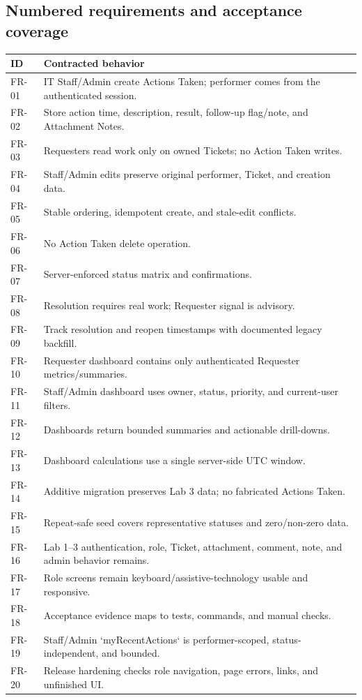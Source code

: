 \documentclass[10pt,a4paper]{article}
\begin{document}
\subsection*{Numbered requirements and acceptance coverage}
\begin{center}\scriptsize
\begin{tabularx}{\linewidth}{@{}p{17mm}Y@{}}
\toprule
ID & Contracted behavior \\
\midrule
FR-01 & IT Staff/Admin create Actions Taken; performer comes from the authenticated session. \\
FR-02 & Store action time, description, result, follow-up flag/note, and Attachment Notes. \\
FR-03 & Requesters read work only on owned Tickets; no Action Taken writes. \\
FR-04 & Staff/Admin edits preserve original performer, Ticket, and creation data. \\
FR-05 & Stable ordering, idempotent create, and stale-edit conflicts. \\
FR-06 & No Action Taken delete operation. \\
FR-07 & Server-enforced status matrix and confirmations. \\
FR-08 & Resolution requires real work; Requester signal is advisory. \\
FR-09 & Track resolution and reopen timestamps with documented legacy backfill. \\
FR-10 & Requester dashboard contains only authenticated Requester metrics/summaries. \\
FR-11 & Staff/Admin dashboard uses owner, status, priority, and current-user filters. \\
FR-12 & Dashboards return bounded summaries and actionable drill-downs. \\
FR-13 & Dashboard calculations use a single server-side UTC window. \\
FR-14 & Additive migration preserves Lab 3 data; no fabricated Actions Taken. \\
FR-15 & Repeat-safe seed covers representative statuses and zero/non-zero data. \\
FR-16 & Lab 1--3 authentication, role, Ticket, attachment, comment, note, and admin behavior remains. \\
FR-17 & Role screens remain keyboard/assistive-technology usable and responsive. \\
FR-18 & Acceptance evidence maps to tests, commands, and manual checks. \\
FR-19 & Staff/Admin `myRecentActions` is performer-scoped, status-independent, and bounded. \\
FR-20 & Release hardening checks role navigation, page errors, links, and unfinished UI. \\
\bottomrule
\end{tabularx}
\end{center}
\end{document}
